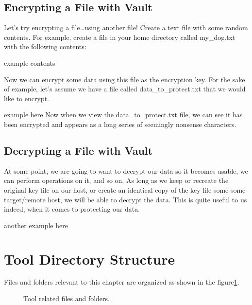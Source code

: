 \subsection{Encrypting a File with Vault}

\justify{}
Let's try encrypting a file\ldots using another file! Create a text file
with some random contents. For example, create a file in your home
directory called my\_dog.txt with the following contents:

example contents

\justify{}
Now we can encrypt some data using this file as the encryption key. For
the sake of example, let's assume we have a file called
data\_to\_protect.txt that we would like to encrypt.

example here
\justify{}
Now when we view the data\_to\_protect.txt file, we can see it has been
encrypted and appears as a long series of seemingly nonsense characters.

\subsection{Decrypting a File with Vault}
\justify{}
At some point, we are going to want to decrypt our data so it becomes
usable, we can perform operations on it, and so on. As long as we keep
or recreate the original key file on our host, or create an identical
copy of the key file some some target/remote host, we will be able to
decrypt the data. This is quite useful to us indeed, when it comes to
protecting our data.

another example here

\clearpage

\section{Tool Directory Structure}
\justify{}
Files and folders relevant to this chapter are organized as shown in
the figure\ref{toolsfiles}.

\begin{figure}[!htb]
	
	\caption{Tool related files and folders.}
\label{toolsfiles}
\end{figure}

